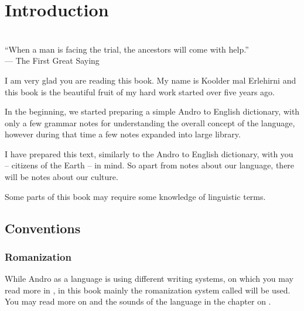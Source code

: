 \chapter{Introduction}
\label{ch:introduction}

\begin{flushright}\small
  \\
  ``When a man is facing the trial, the ancestors will come with help.''\\
  --- The First Great Saying\footnotemark
\end{flushright}\bigskip


 I am very glad you are reading this book. My name is
Koolder mal Erlehirni and this book is the beautiful fruit of my hard work
started over five years ago.

In the beginning, we started preparing a simple Andro to English dictionary,
with only a few grammar notes for understanding the overall concept of the
language, however during that time a few notes expanded into large library.

I have prepared this text, similarly to the Andro to English dictionary, with
you -- citizens of the Earth -- in mind. So apart from notes about our language,
there will be notes about our culture.

Some parts of this book may require some knowledge of linguistic terms.

\bigskip


\section{Conventions}

\subsection{Romanization}

While Andro as a language is using different writing systems, on which you may
read more in , in this book mainly the romanization system
called  will be used. You may read more on  and the
sounds of the language in the chapter on .

